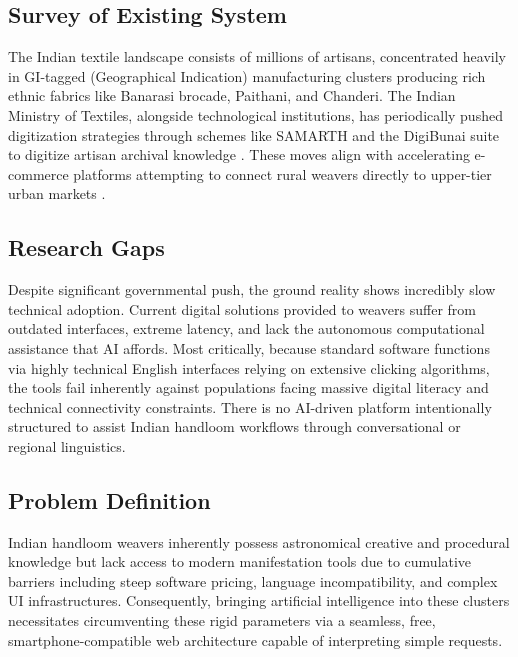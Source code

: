 \subsection{Survey of Existing System}
The Indian textile landscape consists of millions of artisans, concentrated heavily in GI-tagged (Geographical Indication) manufacturing clusters producing rich ethnic fabrics like Banarasi brocade, Paithani, and Chanderi. The Indian Ministry of Textiles, alongside technological institutions, has periodically pushed digitization strategies through schemes like SAMARTH and the DigiBunai suite to digitize artisan archival knowledge \cite{ref10}. These moves align with accelerating e-commerce platforms attempting to connect rural weavers directly to upper-tier urban markets \cite{ref11}.

\subsection{Research Gaps}
Despite significant governmental push, the ground reality shows incredibly slow technical adoption. Current digital solutions provided to weavers suffer from outdated interfaces, extreme latency, and lack the autonomous computational assistance that AI affords. Most critically, because standard software functions via highly technical English interfaces relying on extensive clicking algorithms, the tools fail inherently against populations facing massive digital literacy and technical connectivity constraints. There is no AI-driven platform intentionally structured to assist Indian handloom workflows through conversational or regional linguistics.

\subsection{Problem Definition}
Indian handloom weavers inherently possess astronomical creative and procedural knowledge but lack access to modern manifestation tools due to cumulative barriers including steep software pricing, language incompatibility, and complex UI infrastructures. Consequently, bringing artificial intelligence into these clusters necessitates circumventing these rigid parameters via a seamless, free, smartphone-compatible web architecture capable of interpreting simple requests.

